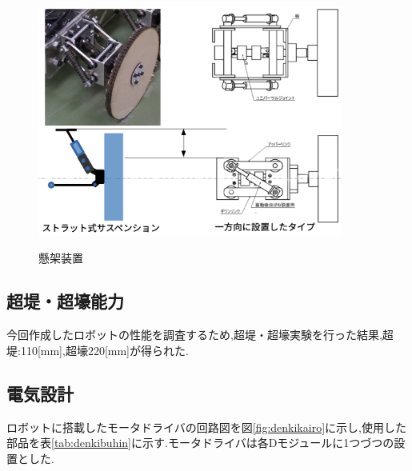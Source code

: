 \documentclass[12pt,oneside]{sotsuken_paper}
\begin{document}
\begin{figure}[htp] 
 \begin{center} 
  \includegraphics[width=100mm]{img/hard/3.png} 
 　\caption{懸架装置} 
  \label{fig:kenka}%
 \end{center} 
\end{figure} 


\subsection{超堤・超壕能力} 
今回作成したロボットの性能を調査するため,超堤・超壕実験を行った結果,超堤:110[mm],超壕220[mm]が得られた. 

\subsection{電気設計} 
ロボットに搭載したモータドライバの回路図を図\ref{fig:denkikairo}に示し,使用した部品を表\ref{tab:denkibuhin}に示す.モータドライバは各Dモジュールに1つづつの設置とした. 
\end{document}
